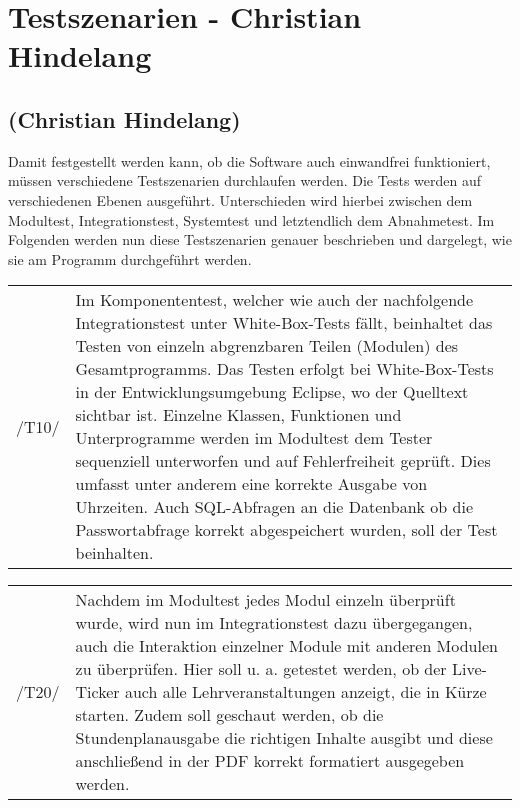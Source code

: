 \section{Testszenarien - Christian Hindelang}
\label{sec:Testszenarien}

\subsection*{(Christian Hindelang)}

Damit festgestellt werden kann, ob die Software auch einwandfrei funktioniert, müssen verschiedene Testszenarien durchlaufen werden.
Die Tests werden auf verschiedenen Ebenen ausgeführt. Unterschieden wird hierbei zwischen dem Modultest, Integrationstest, Systemtest und letztendlich dem Abnahmetest.
Im Folgenden werden nun diese Testszenarien genauer beschrieben und dargelegt, wie sie am Programm durchgeführt werden.

\begin{tabular}{p{1.5cm}p{14.5cm}}
 /T10/	& Im Komponententest, welcher wie auch der nachfolgende Integrationstest unter White-Box-Tests fällt, beinhaltet das Testen von einzeln abgrenzbaren Teilen (Modulen) des Gesamtprogramms. Das Testen erfolgt bei White-Box-Tests in der Entwicklungsumgebung Eclipse, wo der Quelltext sichtbar ist. Einzelne Klassen, Funktionen und Unterprogramme werden im Modultest dem Tester sequenziell unterworfen und auf Fehlerfreiheit geprüft. Dies umfasst unter anderem eine korrekte Ausgabe von Uhrzeiten. Auch SQL-Abfragen an die Datenbank ob die Passwortabfrage korrekt abgespeichert wurden, soll der Test beinhalten. \\[0.25cm]	 
\end{tabular}

\begin{tabular}{p{1.5cm}p{14.5cm}}
 /T20/	& Nachdem im Modultest jedes Modul einzeln überprüft wurde, wird nun im Integrationstest dazu übergegangen, auch die Interaktion einzelner Module mit anderen Modulen zu überprüfen.
Hier soll u. a. getestet werden, ob der Live-Ticker auch alle Lehrveranstaltungen anzeigt, die in Kürze starten. Zudem soll geschaut werden, ob die Stundenplanausgabe die richtigen Inhalte ausgibt und diese anschließend in der PDF korrekt formatiert ausgegeben werden. \\[0.25cm]	 
\end{tabular}

